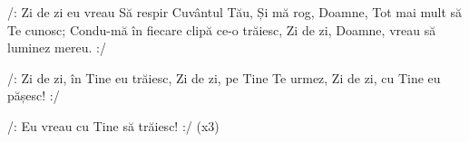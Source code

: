 \beginverse
/: Zi de zi eu vreau
Să respir Cuvântul Tău,
Și mă rog, Doamne,
Tot mai mult să Te cunosc;
Condu-mă în fiecare clipă ce-o trăiesc,
Zi de zi, Doamne, vreau să luminez mereu. :/
\endverse

\beginchorus
/: Zi de zi, în Tine eu trăiesc,
Zi de zi, pe Tine Te urmez,
Zi de zi, cu Tine eu pășesc! :/
\endchorus

\beginverse*
/: Eu vreau cu Tine să trăiesc! :/ (x3)
\endverse
\endsong
